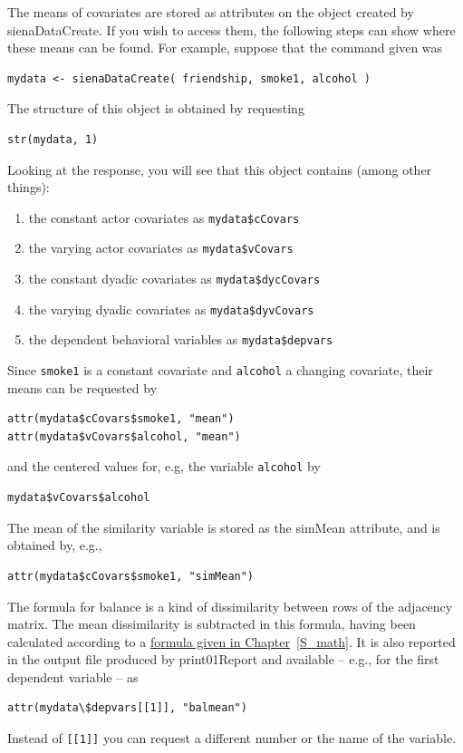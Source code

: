 \documentclass[a4paper,fleqn,11pt]{article}
\newcommand{\+}{\, + \,}
\newcommand{\sfn}[1]{\textsf{#1}}
\begin{document}
The means of covariates are stored as attributes on the object created by
\textsf{sienaDataCreate}.
If you wish to access them, the following steps can show
where these means can be found.
For example, suppose that the command given was
\begin{verbatim}
mydata <- sienaDataCreate( friendship, smoke1, alcohol )
\end{verbatim}
The structure of this object is obtained by requesting
\begin{verbatim}
str(mydata, 1)
\end{verbatim}
Looking at the response, you
will see that this object contains (among other things):
\begin{enumerate}
\item the constant actor covariates as \texttt{mydata\$cCovars}
\item the varying actor covariates as \texttt{mydata\$vCovars}
\item the constant dyadic covariates as \texttt{mydata\$dycCovars}
\item the varying dyadic covariates as \texttt{mydata\$dyvCovars}
\item the dependent behavioral variables as \texttt{mydata\$depvars}
\end{enumerate}
Since \texttt{smoke1} is a constant covariate and \texttt{alcohol}
a changing covariate, their means can be requested by
\begin{verbatim}
attr(mydata$cCovars$smoke1, "mean")
attr(mydata$vCovars$alcohol, "mean")
\end{verbatim}
and the centered values for, e.g, the variable \texttt{alcohol} by
\begin{verbatim}
mydata$vCovars$alcohol
\end{verbatim}
The mean of the similarity variable is stored as the \sfn{simMean} attribute,
and is obtained by, e.g.,
\begin{verbatim}
attr(mydata$cCovars$smoke1, "simMean")
\end{verbatim}

The formula for balance is a kind of dissimilarity between rows of
the adjacency matrix. The mean dissimilarity is subtracted in this
formula, having been calculated according to a
\hyperlink{T_meanbal}{formula given in Chapter}~\ref{S_math}.
It is also reported in the
 output file produced by \sfn{print01Report} and available -- e.g., for the first
dependent variable -- as
\begin{verbatim}
attr(mydata\$depvars[[1]], "balmean")
\end{verbatim}
Instead of \texttt{[[1]]} you can request a different number or
the name of the variable.
\smallskip
\end{document}
